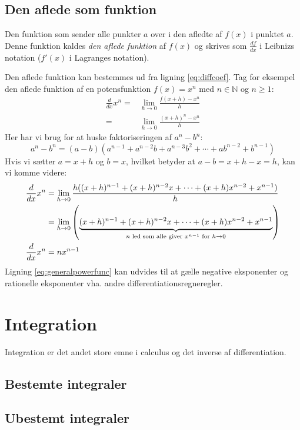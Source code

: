\documentclass[a4paper, 11pt]{article}
\begin{document}
\subsection{Den aflede som funktion}
Den funktion som sender alle punkter $a$ over i den afledte af $f(x)$ i punktet $a$. Denne funktion kaldes \emph{den aflede funktion} af $f(x)$ og skrives som $\frac{df}{dx}$ i Leibnizs notation ($f'(x)$ i Lagranges notation).

Den aflede funktion kan bestemmes ud fra ligning \eqref{eq:diffcoef}. Tag for eksempel den aflede funktion af en potensfunktion $f(x) = x^n$ med $n \in \mathbb{N}$ og $n \geq 1$:
\begin{align}
\frac{d}{dx}x^n =& \lim_{h\to0}\frac{f(x+h) - x^n}{h} \\
                =& \lim_{h\to0}\frac{(x+h)^n - x^n}{h}\label{eq:powerstuck}
\end{align}
Her har vi brug for at huske faktoriseringen af $a^n - b^n$:
\begin{equation}
a^n - b^n = (a-b)(a^{n-1} + a^{n-2}b + a^{n-3}b^2 + \cdots + a b^{n-2} + b^{n-1})
\end{equation} 
Hvis vi sætter $a=x+h$ og $b=x$, hvilket betyder at $a-b=x+h-x=h$, kan vi komme videre:
\begin{align}
\frac{d}{dx}x^n &= \lim_{h\to0}\frac{h((x+h)^{n-1} + (x+h)^{n-2}x + \cdots + (x+h)x^{n-2} + x^{n-1})}{h}\notag \\
                &= \lim_{h\to0}\left(\underbrace{(x+h)^{n-1} + (x+h)^{n-2}x + \cdots + (x+h)x^{n-2} + x^{n-1}}_
                   {n\text{ led som alle giver } x^{n-1}\text{ for } h\to0}\right)\notag \\
\frac{d}{dx}x^n &= nx^{n-1}\label{eq:generalpowerfunc}
\end{align}
Ligning \eqref{eq:generalpowerfunc} kan udvides til at gælle negative eksponenter og rationelle eksponenter vha. andre differentiationsregneregler.

\section{Integration}
Integration er det andet store emne i calculus og det inverse af differentiation. 
\subsection{Bestemte integraler}

\subsection{Ubestemt integraler}
\end{document}
